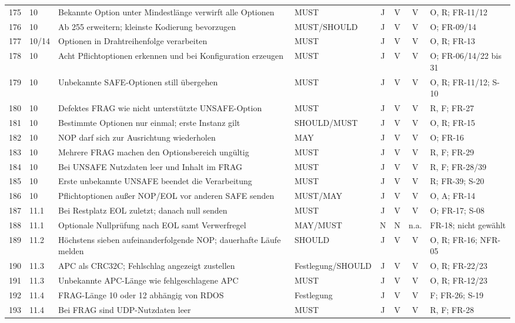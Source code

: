 \begin{longtable}{@{}r l L{4.45cm} L{2.00cm} c c c L{4.20cm}@{}}
175 & 10 & Bekannte Option unter Mindestlänge verwirft alle Optionen & MUST & J & V & V & O, R; FR-11/12 \\
176 & 10 & Ab 255 erweitern; kleinste Kodierung bevorzugen & MUST\slash SHOULD & J & V & V & O; FR-09/14 \\
177 & 10/14 & Optionen in Drahtreihenfolge verarbeiten & MUST & J & V & V & O, R; FR-13 \\
178 & 10 & Acht Pflichtoptionen erkennen und bei Konfiguration erzeugen & MUST & J & V & V & O; FR-06/14/22 bis 31 \\
179 & 10 & Unbekannte SAFE-Optionen still übergehen & MUST & J & V & V & O, R; FR-11/12; S-10 \\
180 & 10 & Defektes FRAG wie nicht unterstützte UNSAFE-Option & MUST & J & V & V & R, F; FR-27 \\
181 & 10 & Bestimmte Optionen nur einmal; erste Instanz gilt & SHOULD\slash MUST & J & V & V & O, R; FR-15 \\
182 & 10 & NOP darf sich zur Ausrichtung wiederholen & MAY & J & V & V & O; FR-16 \\
183 & 10 & Mehrere FRAG machen den Optionsbereich ungültig & MUST & J & V & V & R, F; FR-29 \\
184 & 10 & Bei UNSAFE Nutzdaten leer und Inhalt im FRAG & MUST & J & V & V & R, F; FR-28/39 \\
185 & 10 & Erste unbekannte UNSAFE beendet die Verarbeitung & MUST & J & V & V & R; FR-39; S-20 \\
186 & 10 & Pflichtoptionen außer NOP/EOL vor anderen SAFE senden & MUST\slash MAY & J & V & V & O, A; FR-14 \\
187 & 11.1 & Bei Restplatz EOL zuletzt; danach null senden & MUST & J & V & V & O; FR-17; S-08 \\
188 & 11.1 & Optionale Nullprüfung nach EOL samt Verwerfregel & MAY\slash MUST & N & N & n.a. & FR-18; nicht gewählt \\
189 & 11.2 & Höchstens sieben aufeinanderfolgende NOP; dauerhafte Läufe melden & SHOULD & J & V & V &
  O, R; FR-16; NFR-05 \\
190 & 11.3 & APC als CRC32C; Fehlschlag angezeigt zustellen & Festlegung\slash SHOULD & J & V & V & O, R; FR-22/23 \\
191 & 11.3 & Unbekannte APC-Länge wie fehlgeschlagene APC & MUST & J & V & V & O, R; FR-12/23 \\
192 & 11.4 & FRAG-Länge 10 oder 12 abhängig von RDOS & Festlegung & J & V & V & F; FR-26; S-19 \\
193 & 11.4 & Bei FRAG sind UDP-Nutzdaten leer & MUST & J & V & V & R, F; FR-28 \\

\end{longtable}
